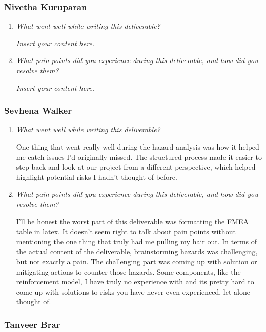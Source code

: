 \documentclass{article}
\newcommand{\lips}{\textit{Insert your content here.}}
\begin{document}
\subsubsection*{Nivetha Kuruparan}

\begin{enumerate}
  \item \textit{What went well while writing this deliverable?}
  
  \lips

  \item \textit{What pain points did you experience during this deliverable, and how did you resolve them?}
  
  \lips

\end{enumerate}

\subsubsection*{Sevhena Walker}

\begin{enumerate}
  \item \textit{What went well while writing this deliverable?}
  
  One thing that went really well during the hazard analysis was how it helped me catch issues I’d originally missed. The structured process made it easier to step back and look at our project from a different perspective, which helped highlight potential risks I hadn’t thought of before. 

  \item \textit{What pain points did you experience during this deliverable, and how did you resolve them?}
  
  I'll be honest the worst part of this deliverable was formatting the FMEA table in latex. It doesn't seem right to talk about pain points without mentioning the one thing that truly had me pulling my hair out. In terms of the actual content of the deliverable, brainstorming hazards was challenging, but not exactly a pain. The challenging part was coming up with solution or mitigating actions to counter those hazards. Some components, like the reinforcement model, I have truly no experience with and its pretty hard to come up with solutions to risks you have never even experienced, let alone thought of. 
  
\end{enumerate}

\subsubsection*{Tanveer Brar}
\end{document}
